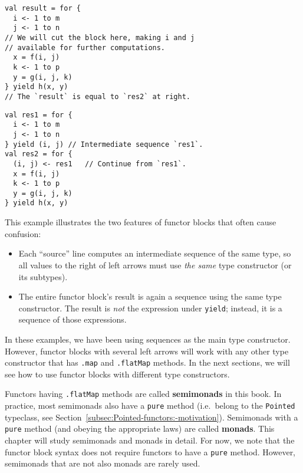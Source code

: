 \noindent \texttt{\textcolor{blue}{\footnotesize{}}}%
\begin{minipage}[c]{0.475\columnwidth}%
\texttt{\textcolor{blue}{\footnotesize{}}}
\begin{lstlisting}
val result = for {
  i <- 1 to m
  j <- 1 to n
// We will cut the block here, making i and j
// available for further computations.
  x = f(i, j)
  k <- 1 to p
  y = g(i, j, k)
} yield h(x, y)
// The `result` is equal to `res2` at right.
\end{lstlisting}
%
\end{minipage}\texttt{\textcolor{blue}{\footnotesize{}\hspace*{\fill}}}%
\begin{minipage}[c]{0.475\columnwidth}%
\texttt{\textcolor{blue}{\footnotesize{}}}
\begin{lstlisting}
val res1 = for {
  i <- 1 to m
  j <- 1 to n
} yield (i, j) // Intermediate sequence `res1`.
val res2 = for {
  (i, j) <- res1   // Continue from `res1`.
  x = f(i, j)
  k <- 1 to p
  y = g(i, j, k)
} yield h(x, y)
\end{lstlisting}
%
\end{minipage}{\footnotesize\par}

\vspace{0.2\baselineskip}
This example illustrates the two features of functor blocks that often
cause confusion:
\begin{itemize}
\item Each ``source'' line computes an intermediate sequence of the same
type, so all values to the right of left arrows must use \emph{the
same} type constructor (or its subtypes).
\item The entire functor block's result is again a sequence using the same
type constructor. The result is \emph{not} the expression under \lstinline!yield!;
instead, it is a sequence of those expressions.
\end{itemize}
In these examples, we have been using sequences as the main type constructor.
However, functor blocks with several left arrows will work with any
other type constructor that has \lstinline!.map! and \lstinline!.flatMap!
methods. In the next sections, we will see how to use functor blocks
with different type constructors. 

Functors having \lstinline!.flatMap! methods are called \textbf{semimonads}
in this book. In practice, most semimonads also
have a \lstinline!pure! method (i.e.~belong to the \lstinline!Pointed!
typeclass, see Section~\ref{subsec:Pointed-functors:-motivation}).
Semimonads with a \lstinline!pure! method (and obeying the appropriate
laws) are called \textbf{monads}. This chapter will
study semimonads and monads in detail. For now, we note that the functor
block syntax does not require functors to have a \lstinline!pure!
method. However, semimonads that are not also monads are rarely used.

